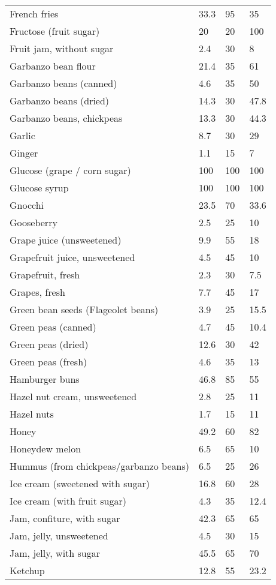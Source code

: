 \documentclass[../main.tex]{subfiles}
\begin{document}
\begin{longtable}{llll}
French fries & 33.3 & 95 & 35 \\
Fructose (fruit sugar) & 20 & 20 & 100 \\
Fruit jam, without sugar & 2.4 & 30 & 8 \\
Garbanzo bean flour & 21.4 & 35 & 61 \\
Garbanzo beans (canned) & 4.6 & 35 & 50 \\
Garbanzo beans (dried) & 14.3 & 30 & 47.8 \\
Garbanzo beans, chickpeas & 13.3 & 30 & 44.3 \\
Garlic & 8.7 & 30 & 29 \\
Ginger & 1.1 & 15 & 7 \\
Glucose (grape / corn sugar) & 100 & 100 & 100 \\
Glucose syrup & 100 & 100 & 100 \\
Gnocchi & 23.5 & 70 & 33.6 \\
Gooseberry & 2.5 & 25 & 10 \\
Grape juice (unsweetened) & 9.9 & 55 & 18 \\
Grapefruit juice, unsweetened & 4.5 & 45 & 10 \\
Grapefruit, fresh & 2.3 & 30 & 7.5 \\
Grapes, fresh & 7.7 & 45 & 17 \\
Green bean seeds (Flageolet beans) & 3.9 & 25 & 15.5 \\
Green peas (canned) & 4.7 & 45 & 10.4 \\
Green peas (dried) & 12.6 & 30 & 42 \\
Green peas (fresh) & 4.6 & 35 & 13 \\
Hamburger buns & 46.8 & 85 & 55 \\
Hazel nut cream, unsweetened & 2.8 & 25 & 11 \\
Hazel nuts & 1.7 & 15 & 11 \\
Honey & 49.2 & 60 & 82 \\
Honeydew melon & 6.5 & 65 & 10 \\
Hummus (from chickpeas/garbanzo beans) & 6.5 & 25 & 26 \\
Ice cream (sweetened with sugar) & 16.8 & 60 & 28 \\
Ice cream (with fruit sugar) & 4.3 & 35 & 12.4 \\
Jam, confiture, with sugar & 42.3 & 65 & 65 \\
Jam, jelly, unsweetened & 4.5 & 30 & 15 \\
Jam, jelly, with sugar & 45.5 & 65 & 70 \\
Ketchup & 12.8 & 55 & 23.2 \\

\end{longtable}
\end{document}
